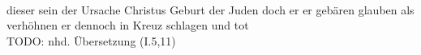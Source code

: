 \begin{exe}
\ex \label{ex:I4134} \gll {}                         \\
{dieser} {sein} {der} {Ursache} {Christus} {Geburt} {} {der} {Juden} {} {doch} {er} {er} {gebären} {glauben als} {} {verhöhnen} {er} {dennoch} {in} {Kreuz} {schlagen} {und} {tot} {}\\
\glt TODO: nhd. Übersetzung (I.5,11)
\end{exe}
